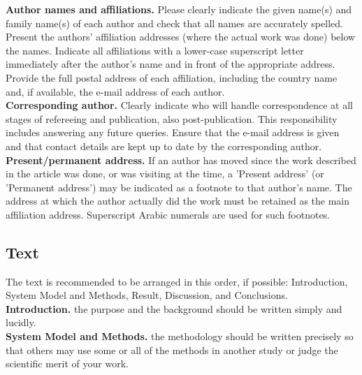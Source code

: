 \documentclass[final,3p,times,twocolumn]{elsarticle}
\begin{document}
\textbf{Author names and affiliations. }Please clearly indicate the given name(s) and family name(s) of each author and check that all names are accurately spelled. 
Present the authors' affiliation addresses (where the actual work was done) below the names. 
Indicate all affiliations with a lower-case superscript letter immediately after the author's name and in front of the appropriate address. 
Provide the full postal address of each affiliation, including the country name and, if available, the e-mail address of each author.\\

\textbf{Corresponding author. }Clearly indicate who will handle correspondence at all stages of refereeing and publication, also post-publication. 
This responsibility includes answering any future queries. 
Ensure that the e-mail address is given and that contact details are kept up to date by the corresponding author.\\

\textbf{Present/permanent address. }If an author has moved since the work described in the article was done, or was visiting at the time, a 'Present address' (or 'Permanent address') may be indicated as a footnote to that author's name. 
The address at which the author actually did the work must be retained as the main affiliation address. 
Superscript Arabic numerals are used for such footnotes.

\subsection{Text}

The text is recommended to be arranged in this order, if possible: Introduction, System Model and Methods, Result, Discussion, and Conclusions.\\

\textbf{Introduction.} the purpose and the background should be written simply and lucidly. \\

\textbf{System Model and Methods.} the methodology should be written precisely so that others may use some or all of the methods in another study or judge the scientific merit of your work.\\
\end{document}
